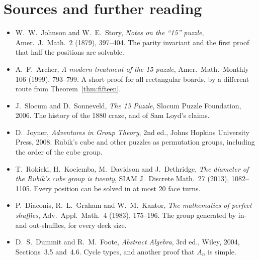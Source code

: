 \section*{Sources and further reading}

\begin{itemize}
\item W.~W.~Johnson and W.~E.~Story, \emph{Notes on the ``15'' puzzle}, Amer.\ J.\ Math.\ 2 (1879), 397--404. The parity invariant and the first proof that half the positions are solvable.
\item A.~F.~Archer, \emph{A modern treatment of the 15 puzzle}, Amer.\ Math.\ Monthly 106 (1999), 793--799. A short proof for all rectangular boards, by a different route from Theorem~\ref{thm:fifteen}.
\item J.~Slocum and D.~Sonneveld, \emph{The 15 Puzzle}, Slocum Puzzle Foundation, 2006. The history of the 1880 craze, and of Sam Loyd's claims.
\item D.~Joyner, \emph{Adventures in Group Theory}, 2nd ed., Johns Hopkins University Press, 2008. Rubik's cube and other puzzles as permutation groups, including the order of the cube group.
\item T.~Rokicki, H.~Kociemba, M.~Davidson and J.~Dethridge, \emph{The diameter of the Rubik's cube group is twenty}, SIAM J.\ Discrete Math.\ 27 (2013), 1082--1105. Every position can be solved in at most $20$ face turns.
\item P.~Diaconis, R.~L.~Graham and W.~M.~Kantor, \emph{The mathematics of perfect shuffles}, Adv.\ Appl.\ Math.\ 4 (1983), 175--196. The group generated by in- and out-shuffles, for every deck size.
\item D.~S.~Dummit and R.~M.~Foote, \emph{Abstract Algebra}, 3rd ed., Wiley, 2004, Sections~3.5 and~4.6. Cycle types, and another proof that $A_n$ is simple.
\end{itemize}

